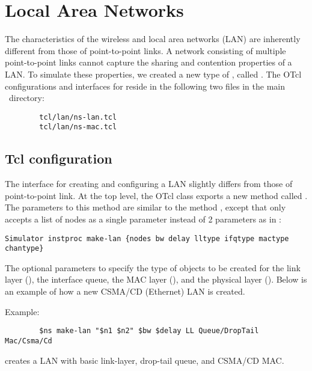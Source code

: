 %


%
%
\chapter{Local Area Networks}
\label{chap:lan}

The characteristics of the wireless and local area networks (LAN) are
inherently different from those of point-to-point links.  A network
consisting of multiple point-to-point links cannot capture the sharing
and contention properties of a LAN.  To simulate these properties, we
created a new type of , called .  The OTcl
configurations and interfaces for  reside in the following
two files in the main \ns\ directory:

\begin{verbatim}
        tcl/lan/ns-lan.tcl
        tcl/lan/ns-mac.tcl
\end{verbatim}

\section{Tcl configuration}
\label{sec:lan_tcl}

The interface for creating and configuring a LAN slightly differs from
those of point-to-point link.  At the top level, the OTcl class
 exports a new method called .  The
parameters to this method are similar to the method ,
except that  only accepts a list of nodes as a single
parameter instead of 2 parameters as in :

\begin{verbatim}
Simulator instproc make-lan {nodes bw delay lltype ifqtype mactype chantype}
\end{verbatim}

The optional parameters to  specify the type of objects
to be created for the link layer (), the interface queue, the
MAC layer (), and the physical layer ().  Below
is an example of how a new CSMA/CD (Ethernet) LAN is created.

Example:
\begin{verbatim}
        $ns make-lan "$n1 $n2" $bw $delay LL Queue/DropTail Mac/Csma/Cd
\end{verbatim}
creates a LAN with basic link-layer, drop-tail queue, and CSMA/CD MAC.


